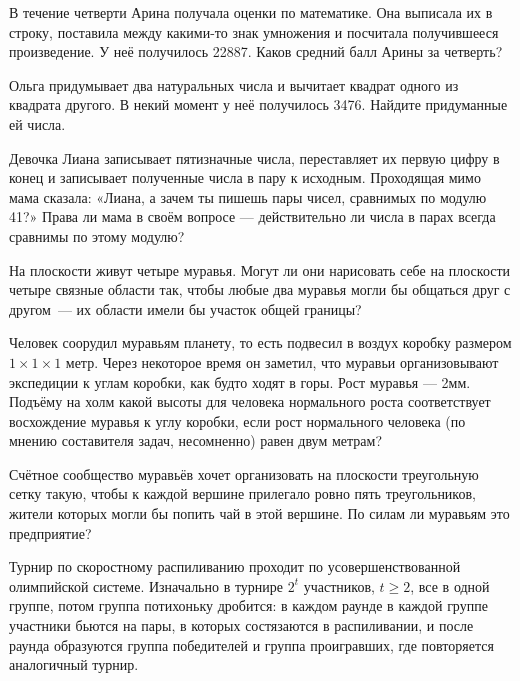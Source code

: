 \begin{itemize}
\itA В течение четверти Арина получала оценки по математике. Она выписала их в строку, поставила между какими-то знак умножения и посчитала получившееся произведение. У неё получилось 22887. Каков средний балл Арины за четверть?

\itB Ольга придумывает два натуральных числа и вычитает квадрат одного из квадрата другого. В некий момент у неё получилось 3476. Найдите придуманные ей числа.

\itC Девочка Лиана записывает пятизначные числа, переставляет их первую цифру в конец и записывает полученные числа в пару к исходным. Проходящая мимо мама сказала: «Лиана, а зачем ты пишешь пары чисел, сравнимых по модулю 41?» Права ли мама в своём вопросе --- действительно ли числа в парах всегда сравнимы по этому модулю?
\end{itemize}

\begin{itemize}
\itA На плоскости живут четыре муравья. Могут ли они нарисовать себе на плоскости четыре связные области так, чтобы любые два муравья могли бы общаться друг с другом~— их области имели бы участок общей границы?

\itB Человек соорудил муравьям планету, то есть подвесил в воздух коробку размером $1 \times 1 \times 1$ метр. Через некоторое время он заметил, что муравьи организовывают экспедиции к углам коробки, как будто ходят в горы. Рост муравья — 2мм. Подъёму на холм какой высоты для человека нормального роста соответствует восхождение муравья к углу коробки, если рост нормального человека (по мнению составителя задач, несомненно) равен двум метрам?

\itC Счётное сообщество муравьёв хочет организовать на плоскости треугольную сетку такую, чтобы к каждой вершине прилегало ровно пять треугольников, жители которых могли бы попить чай в этой вершине. По силам ли муравьям это предприятие?
\end{itemize}


Турнир по скоростному распиливанию проходит по усовершенствованной олимпийской системе. Изначально в турнире $2^t$ участников, $t \geq 2$, все в одной группе, потом группа потихоньку дробится: в каждом раунде в каждой группе участники бьются на пары, в которых состязаются в распиливании, и после раунда образуются группа победителей и группа проигравших, где повторяется аналогичный турнир.

